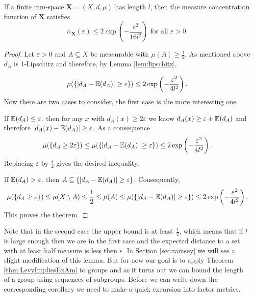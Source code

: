 		
\begin{theorem}\label{thm:measureConcetration}
	If a finite mm-space $\boldsymbol{X}=(X,d,\mu)$ has length $l$, then the measure concentration function of $\boldsymbol X$ satisfies
	\[\alpha_{\boldsymbol{X}}(\varepsilon)\leq 2\exp\left(-\frac{\varepsilon^2}{16l^2}\right)\text{ for all $\varepsilon>0$}.\]
\end{theorem}
\begin{proof}
	Let $\varepsilon>0$ and $A\subseteq X$ be measurable with $\mu(A)\geq\frac{1}{2}$. As mentioned above $d_A$ is 1-Lipschitz and therefore, by Lemma \ref{lem:lipschitz},
				
	\[\mu(\{|d_A-\mathbb{E}(d_A)|\geq\varepsilon\})\leq 2\exp\left(-\frac{\varepsilon^2}{4l^2}\right).\]
	Now there are two cases to consider, the first case is the more interesting one.
				
	If $\mathbb{E}(d_A)\leq\varepsilon$, then for any $x$ with $d_A(x)\geq2\varepsilon$ we know $d_A(x)\geq \varepsilon+\mathbb{E}(d_A)$ and therefore $|d_A(x)-\mathbb{E}(d_A)|\geq \varepsilon$. As a consequence %
	\[\mu(\{d_A\geq2\varepsilon\})\leq \mu(\{|d_A-\mathbb{E}(d_A)|\geq\varepsilon\})\leq2\exp\left(-\frac{\varepsilon^2}{4l^2}\right) .\]
	Replacing $\varepsilon$ by $\frac{\varepsilon}{2}$ gives the desired inequality.
				
	If $\mathbb{E}(d_A)>\varepsilon$, then $A\subseteq \{|d_A-\mathbb{E}(d_A)|\geq\varepsilon\}$. Consequently,
	\[\mu(\{d_A\geq\varepsilon\})\leq \mu(X\setminus A)\leq \frac{1}{2}\leq \mu(A)\leq \mu(\{|d_A-\mathbb{E}(d_A)|\geq\varepsilon\})\leq 2\exp\left(-\frac{\varepsilon^2}{4l^2}\right).\]
	This proves the theorem.
\end{proof}
Note that in the second case the upper bound is at least $\frac{1}{2}$, which means that if $l$ is large enough then we are in the first case and the expected distance to a set with at least half measure is less then $\varepsilon$. In Section \ref{sec:ramsey} we will see a slight modification of this lemma.
But for now our goal is to apply Theorem \ref{thm:LevyImpliesExAm} to groups and as it turns out we can bound the length of a group using sequences of subgroups. Before we can write down the corresponding corollary we need to make a quick excursion into factor metrics. 
		
